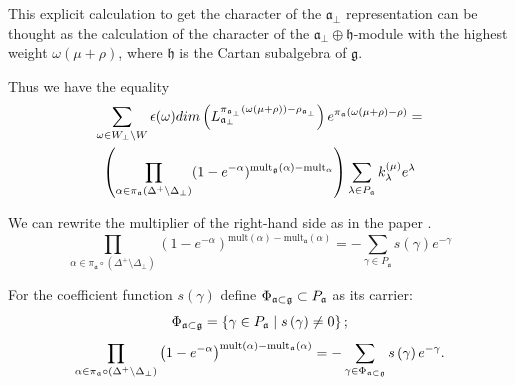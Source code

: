 \documentclass[a4paper,12pt]{article}
\theoremstyle{definition} \newtheorem{Def}{Definition}
\begin{document}
This explicit calculation to get the character of the $\mathfrak{a}_{\bot}$ representation can be thought as the calculation of the character of the $\mathfrak{a}_{\bot}\oplus \mathfrak{h}$-module with the highest weight $\omega(\mu+\rho)$, where $\mathfrak{h}$ is the Cartan subalgebra of $\mathfrak{g}$.

Thus we have the equality
\begin{multline}
  \label{eq:9}
  \sum_{\omega\in W_{\bot}\backslash W} \epsilon(\omega) dim\left(L^{\pi_{\mathfrak{a}_{\bot}}(\omega(\mu+\rho))-\rho_{\mathfrak{a}_{\bot}}}_{\mathfrak{a}_{\bot}}\right) e^{\pi_{\mathfrak{a}}(\omega(\mu+\rho)-\rho)}=\\
  \left(\prod_{\alpha\in \pi_{\mathfrak{a}}\left(\Delta^{+}\setminus \Delta_{\bot}\right)}(1-e^{-\alpha})^{{\rm mult}_{\mathfrak{g}}(\alpha)-{\rm mult}_{\mathfrak{\alpha}}} \right)
  \sum_{\lambda \in P_{\frak{a}}}k_{\lambda}^{\left( \mu \right) }e^{\lambda } 
\end{multline}

We can rewrite the multiplier of the right-hand side as in the paper \cite{ilyin812pbc}.
\begin{equation}
  \label{eq:11}
    \prod_{\alpha\in \pi_{\mathfrak{a}}\circ (\Delta^{+}\setminus \Delta_{\bot})} \left(1-e^{-\alpha}\right)^{\mathrm{mult}(\alpha)-\mathrm{mult}_{\mathfrak{a}}(\alpha)}=
     -\sum_{\gamma\in P_{\mathfrak{a}}} s(\gamma)e^{-\gamma}
\end{equation}

For the coefficient function $s\left( \gamma \right) $ define $\Phi _{\frak{a%
}\subset \frak{g}}\subset P_{\frak{a}}$ as its carrier: 
\begin{equation}
\Phi _{\frak{a}\subset \frak{g}}=\left\{ \gamma \in P_{\frak{a}}\mid s\left(
\gamma \right) \neq 0\right\} ;  \label{phi-d}
\end{equation}
\begin{equation}
\prod_{\alpha\in \pi_{\mathfrak{a}}\circ (\Delta^{+}\setminus \Delta_{\bot})}\left(1-e^{-\alpha }\right) ^{\mathrm{{mult}\left( \alpha \right) -{mult}_{\frak{a}}}\mathrm{\left( \alpha \right) }}=-\sum_{\gamma \in \Phi _{\frak{a}\subset 
\frak{g}}}s\left( \gamma \right) e^{-\gamma }.  \label{fan-d}
\end{equation}
\end{document}
